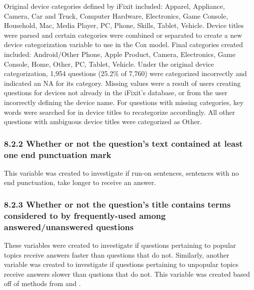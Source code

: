 \documentclass{article}
\begin{document}
Original device categories defined by iFixit included: Apparel, Appliance, Camera, Car and Truck, Computer Hardware, Electronics, Game Console, Household, Mac, Media Player, PC, Phone, Skills, Tablet, Vehicle. Device titles were parsed and certain categories were combined or separated to create a new device categorization variable to use in the Cox model. Final categories created included: Android/Other Phone, Apple Product, Camera, Electronics, Game Console, Home, Other, PC, Tablet, Vehicle. Under the original device categorization, 1,954 questions (25.2\% of 7,760) were categorized incorrectly and indicated an NA for its category. Missing values were a result of users creating questions for devices not already in the iFixit's database, or from the user incorrectly defining the device name. For questions with missing categories, key words were searched for in device titles to recategorize accordingly. All other questions with ambiguous device titles were categorized as Other. 


\subsubsection*{8.2.2 Whether or not the question's text contained at least one end punctuation mark}

This variable was created to investigate if run-on sentences, sentences with no end punctuation, take longer to receive an answer.


\subsubsection*{8.2.3 Whether or not the question's title contains terms considered to by frequently-used among answered/unanswered questions}

These variables were created to investigate if questions pertaining to popular topics receive answers faster than questions that do not. Similarly, another variable was created to investigate if questions pertaining to unpopular topics receive answers slower than qustions that do not. This variable was created based off of methods from \cite{Correa2013} and \cite{Ravi2014}.
\end{document}
